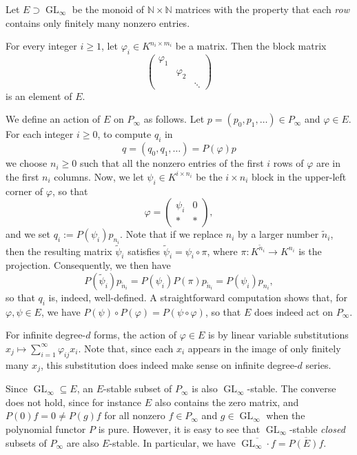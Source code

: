 \documentclass{amsart}
\theoremstyle{plain}
\theoremstyle{definition}
\newcommand{\NN}{\mathbb{N}}
\renewcommand{\phi}{\varphi}
\DeclareMathOperator{\GL}{GL}
\begin{document}
\begin{de}
Let $E \supset \GL_\infty$ be the monoid of $\NN \times
\NN$ matrices with the property that each {\em row} contains only finitely
many nonzero entries.
\end{de}

\begin{ex}
For every integer $i\geq 1$, let $\phi_i\in K^{n_i\times m_i}$ be a matrix. Then the block matrix
\[
\begin{pmatrix}
\phi_1\\&\phi_2\\&&\ddots
\end{pmatrix}
\]
is an element of $E$.
\end{ex}

We define an action of $E$ on $P_\infty$ as follows.
Let $p=(p_0,p_1,\ldots) \in P_\infty$ and $\phi \in E$. For each integer $i\geq0$, to compute $q_i$ in
\[
q=(q_0,q_1,\ldots) =P(\phi) p
\]
we choose $n_i\geq 0$ such that all the nonzero entries of the first $i$ rows of $\phi$ are in the first $n_i$ columns. Now, we let
$\psi_i \in K^{i\times n_i}$ be the $i \times n_i$ block
in the upper-left corner of $\phi$, so that
\[
\phi=\begin{pmatrix} \psi_i & 0 \\ * & * \end{pmatrix},
\]
and we set $q_i:=P(\psi_i)p_{n_i}$. Note that if we replace $n_i$
by a larger number $\tilde{n}_i$, then the resulting matrix
$\tilde{\psi}_i$ satisfies $\tilde{\psi}_i = \psi_i \circ
\pi$, where $\pi:K^{\tilde{n}_i} \to K^{n_i}$ is the
projection. Consequently, we then have
\[
P(\tilde{\psi}_i) p_{\tilde{n}_i}=P(\psi_i)P(\pi)p_{\tilde{n}_i} = P(\psi_i) p_{n_i},
\]
so that $q_i$ is, indeed, well-defined. A straightforward
computation shows that, for $\phi,\psi \in E$, we have
$P(\psi) \circ P(\phi)=P(\psi \circ \phi)$, so that $E$ does
indeed act on $P_\infty$.

For infinite degree-$d$ forms, the action of $\phi \in E$ is by linear
variable substitutions $x_j \mapsto \sum_{i=1}^{\infty} \phi_{ij} x_i$. Note
that, since each $x_i$ appears in the image of only finitely many $x_j$,
this substitution does indeed make sense on infinite
degree-$d$ series.

Since $\GL_\infty \subseteq E$, an $E$-stable subset of $P_\infty$
is also $\GL_\infty$-stable.  The converse does not hold, since for
instance $E$ also contains the zero matrix, and $P(0)f=0 \neq P(g)f$
for all nonzero $f\in P_{\infty}$ and $g \in \GL_\infty$ when the polynomial functor $P$ is pure. However, it is easy to see
that $\GL_\infty$-stable {\em closed} subsets of $P_\infty$ are also
$E$-stable. In particular, we have $\overline{\GL_{\infty}\!\cdot f}=\overline{P(E)f}$.
\end{document}
